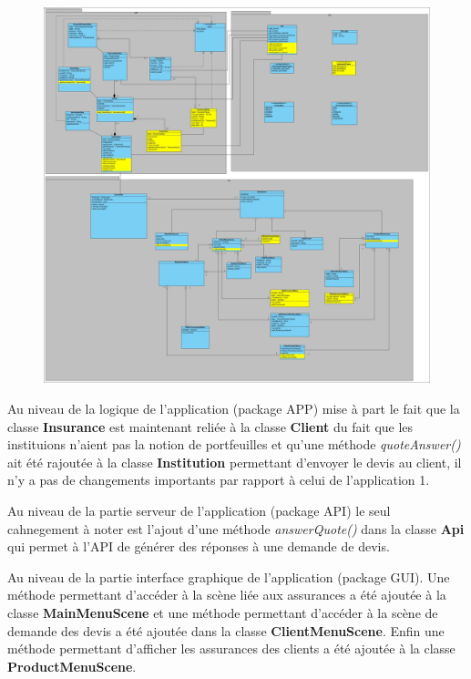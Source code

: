 \documentclass[../rapport.tex]{subfiles}
\begin{document}
				\begin{figure}[h]
						\centering\includegraphics[scale=0.15]{ressources/photos_diagrammes/extensionThomas/classes2Thomas.jpg}
				\end{figure}
		Au niveau de la logique de l'application (package APP) mise à part le fait que la classe 
		\textbf{Insurance} est maintenant reliée à la classe \textbf{Client} du fait que les 
		instituions n'aient pas la notion de portfeuilles et qu'une méthode \textit{quoteAnswer()}
		ait été rajoutée à la classe \textbf{Institution} permettant d'envoyer le devis au client,
		il n'y a pas de changements importants par rapport à celui de l'application 1. 

		\bigskip

		Au niveau de la partie serveur de l'application (package API) le seul cahnegement à noter
		est l'ajout d'une méthode \textit{answerQuote()} dans la classe \textbf{Api} qui permet
		à l'API de générer des réponses à une demande de devis.

		\bigskip

		Au niveau de la partie interface graphique de l'application (package GUI). Une méthode 
		permettant d'accéder à la scène liée aux assurances a été ajoutée à la classe 
		\textbf{MainMenuScene} et une méthode permettant d'accéder à la scène de demande des devis
		a été ajoutée dans la classe \textbf{ClientMenuScene}. Enfin une méthode permettant 
		d'afficher les assurances des clients a été ajoutée à la classe \textbf{ProductMenuScene}.
\end{document}
